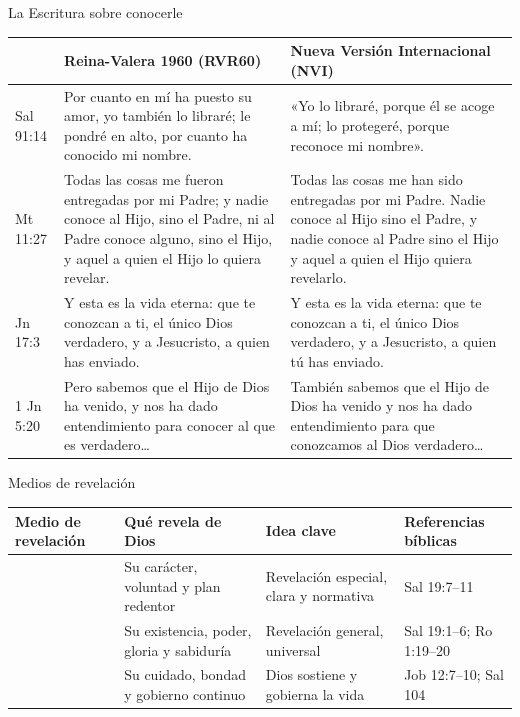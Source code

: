 \begin{frame}{La Escritura sobre conocerle}
\tiny
\begin{tabular}{@{}P{1.2cm} P{4.9cm} P{4.9cm}@{}}
\toprule
 & \textbf{Reina-Valera 1960 (RVR60)} & \textbf{Nueva Versión Internacional (NVI)} \\ \midrule
Sal 91:14 & Por cuanto en mí ha puesto su amor, yo también lo libraré; le pondré en alto, por cuanto ha conocido mi nombre. & «Yo lo libraré, porque él se acoge a mí; lo protegeré, porque reconoce mi nombre». \\
Mt 11:27 & Todas las cosas me fueron entregadas por mi Padre; y nadie conoce al Hijo, sino el Padre, ni al Padre conoce alguno, sino el Hijo, y aquel a quien el Hijo lo quiera revelar. & Todas las cosas me han sido entregadas por mi Padre. Nadie conoce al Hijo sino el Padre, y nadie conoce al Padre sino el Hijo y aquel a quien el Hijo quiera revelarlo. \\
Jn 17:3 & Y esta es la vida eterna: que te conozcan a ti, el único Dios verdadero, y a Jesucristo, a quien has enviado. & Y esta es la vida eterna: que te conozcan a ti, el único Dios verdadero, y a Jesucristo, a quien tú has enviado. \\
1 Jn 5:20 & Pero sabemos que el Hijo de Dios ha venido, y nos ha dado entendimiento para conocer al que es verdadero… & También sabemos que el Hijo de Dios ha venido y nos ha dado entendimiento para que conozcamos al Dios verdadero… \\ \bottomrule
\end{tabular}
\end{frame}

\begin{frame}{Medios de revelación}
\scriptsize
\begin{tabular}{@{}P{2.3cm} P{3.0cm} P{3.0cm} P{2.4cm}@{}}
\toprule
\textbf{Medio de revelación} & \textbf{Qué revela de Dios} & \textbf{Idea clave} & \textbf{Referencias bíblicas} \\ \midrule
{} & Su carácter, voluntad y plan redentor & Revelación especial, clara y normativa & Sal 19:7–11 \\
 & Su existencia, poder, gloria y sabiduría & Revelación general, universal & Sal 19:1–6; Ro 1:19–20 \\
 & Su cuidado, bondad y gobierno continuo & Dios sostiene y gobierna la vida & Job 12:7–10; Sal 104 \\ \bottomrule
\end{tabular}
\end{frame}

